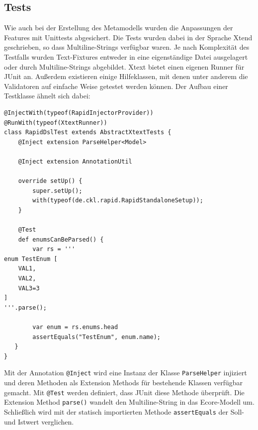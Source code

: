 \documentclass[a4paper,12pt]{scrreprt}
\begin{document}
\subsection{Tests}
Wie auch bei der Erstellung des  Metamodells wurden die Anpassungen der Features mit Unittests abgesichert. Die Tests wurden dabei in der Sprache Xtend geschrieben, so dass Multiline-Strings verfügbar waren. Je nach Komplexität des Testfalls wurden Text-Fixtures entweder in eine eigenständige Datei ausgelagert oder durch Multiline-Strings abgebildet.
Xtext bietet einen eigenen Runner für JUnit an. Außerdem existieren einige Hilfeklassen, mit denen unter anderem die Validatoren auf einfache Weise getestet werden können.
Der Aufbau einer Test\-klasse ähnelt sich dabei:
\begin{verbatim}
@InjectWith(typeof(RapidInjectorProvider))
@RunWith(typeof(XtextRunner))
class RapidDslTest extends AbstractXtextTests {
    @Inject extension ParseHelper<Model>
	
    @Inject extension AnnotationUtil
	
    override setUp() {
        super.setUp();
        with(typeof(de.ckl.rapid.RapidStandaloneSetup));
    }

    @Test
    def enumsCanBeParsed() {
        var rs = '''
enum TestEnum [
    VAL1,
    VAL2,
    VAL3=3
]
'''.parse();

        var enum = rs.enums.head
        assertEquals("TestEnum", enum.name);
   }
}
\end{verbatim}
Mit der Annotation \verb+@Inject+ wird eine Instanz der Klasse \verb+ParseHelper+ injiziert und deren Methoden als Extension Methods für bestehende Klassen verfügbar gemacht.
Mit \verb+@Test+ werden definiert, dass JUnit diese Methode überprüft. Die Extension Method \verb+parse()+ wandelt den Multiline-String in das Ecore-Modell um. Schließlich wird mit der statisch importierten Methode \verb+assertEquals+ der Soll- und Istwert verglichen.
\end{document}
